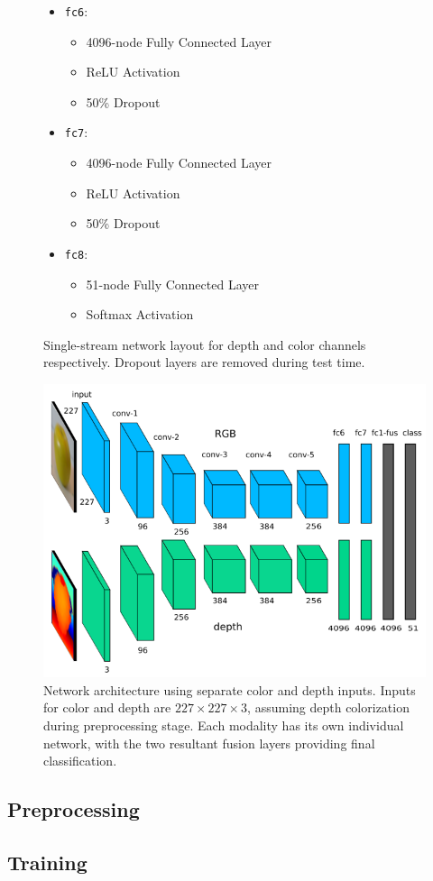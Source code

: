 \begin{figure}
\begin{mdframed}
\begin{itemize}
    \item \texttt{fc6}:
    \begin{itemize}
        \item 4096-node Fully Connected Layer
        \item ReLU Activation
        \item 50\% Dropout
    \end{itemize}
    \item \texttt{fc7}:
    \begin{itemize}
        \item 4096-node Fully Connected Layer
        \item ReLU Activation
        \item 50\% Dropout
    \end{itemize}
    \item \texttt{fc8}:
    \begin{itemize}
        \item 51-node Fully Connected Layer
        \item Softmax Activation
    \end{itemize}
\end{itemize}
\end{mdframed}
\caption{Single-stream network layout for depth and color channels respectively. Dropout layers are removed during test time.}
\label{fig:single_stream_layout}
\end{figure}

\begin{figure}
\includegraphics[width=\linewidth]{img/architecture.png} 
\caption{Network architecture using separate color and depth inputs. Inputs for color and depth are $227 \times 227 \times 3$, assuming depth colorization during preprocessing stage. Each modality has its own individual network, with the two resultant fusion layers providing final classification.}
\label{fig:network}
\end{figure}


\subsection{Preprocessing}

\subsection{Training}




